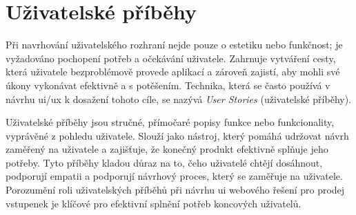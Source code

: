 \section{Uživatelské příběhy}
\label{sec:navrh-uzivatelskeho-rozhrani-uzivatelske-pribehy}
Při navrhování uživatelského rozhraní nejde pouze o estetiku nebo funkčnost; je vyžadováno pochopení potřeb a očekávání uživatele.
Zahrnuje vytváření cesty, která uživatele bezproblémově provede aplikací a zároveň zajistí, aby mohli své úkony vykonávat efektivně a s potěšením.
Technika, která se často používá v návrhu \ac{ui}/\ac{ux} k dosažení tohoto cíle, se nazývá \textit{User Stories} (uživatelské příběhy).

Uživatelské příběhy jsou stručné, přímočaré popisy funkce nebo funkcionality, vyprávěné z pohledu uživatele.
Slouží jako nástroj, který pomáhá udržovat návrh zaměřený na uživatele a zajišťuje, že konečný produkt efektivně splňuje jeho potřeby.
Tyto příběhy kladou důraz na to, čeho uživatelé chtějí dosáhnout, podporují empatii a podporují návrhový proces, který se zaměřuje na uživatele\cite{w_articles_user_stories_a_foundation_for_ui_design}.
Porozumění roli uživatelských příběhů při návrhu \ac{ui} webového řešení pro prodej vstupenek je klíčové pro efektivní splnění potřeb koncových uživatelů.

